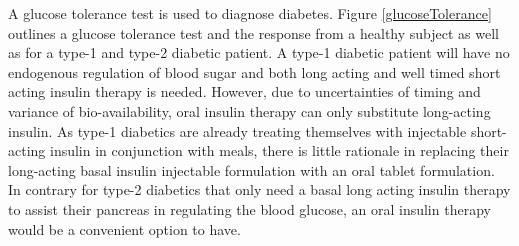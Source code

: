 A glucose tolerance test is used to diagnose diabetes. Figure \ref{glucoseTolerance} outlines a glucose tolerance test and the response from a healthy subject as well as for a type-1 and type-2 diabetic patient. A type-1 diabetic patient will have no endogenous regulation of blood sugar and both long acting and well timed short acting insulin therapy is needed. However, due to uncertainties of timing and variance of bio-availability, oral insulin therapy can only substitute long-acting insulin. As type-1 diabetics are already treating themselves with injectable short-acting insulin in conjunction with meals, there is little rationale in replacing their long-acting basal insulin injectable formulation with an oral tablet formulation. In contrary for type-2 diabetics that only need a basal long acting insulin therapy to assist their pancreas in regulating the blood glucose, an oral insulin therapy would be a convenient option to have.





